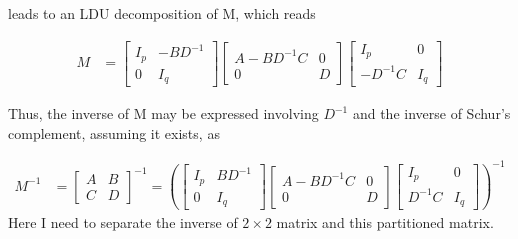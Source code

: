 \documentclass[11pt]{article} %
\begin{document}
leads to an LDU decomposition of M, which reads

\begin{align*}
	M &= \begin{bmatrix}
	I_{p} & -BD^{-1} \\
	0 & I_{q}
\end{bmatrix}  \begin{bmatrix}
		A - BD^{-1}C & 0 \\
		0 & D
	\end{bmatrix}  \begin{bmatrix}
	I_{p} & 0 \\
	-D^{-1}C & I_{q}
\end{bmatrix}
\end{align*}

Thus, the inverse of M may be expressed involving $D^{-1}$ and the inverse of Schur's complement, assuming it exists, as

\begin{align*}
	M^{-1} &= \begin{bmatrix}
		A & B \\
		C & D
	\end{bmatrix}^{-1} = \left(\begin{bmatrix}
	I_{p} & BD^{-1} \\
	0 & I_{q}
\end{bmatrix}  \begin{bmatrix}
A - BD^{-1}C & 0 \\
0 & D
\end{bmatrix}  \begin{bmatrix}
I_{p} & 0 \\
D^{-1}C & I_{q}
\end{bmatrix} \right)^{-1} 
\end{align*}
Here I need to separate the inverse of $2 \times 2$ matrix and this partitioned matrix. 
\end{document}
